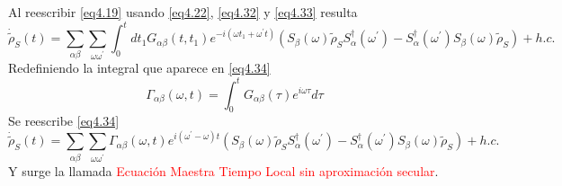 \documentclass{book}
\begin{document}
Al reescribir \ref{eq4.19} usando \ref{eq4.22}, \ref{eq4.32} y \ref{eq4.33} resulta
\begin{equation}\label{eq4.34}\dot{\tilde{\rho}}_S(t)=\sum_{\alpha\beta}\sum_{\omega\omega^\prime}\int_0^t dt_1 G_{\alpha\beta}(t,t_1)e^{-i(\omega t_1+\omega^\prime t)}(S_\beta(\omega)\tilde{\rho}_SS_\alpha^\dag(\omega^\prime)-S_\alpha^\dag(\omega^\prime)S_\beta(\omega)\tilde{\rho}_S)+h.c.\end{equation}
Redefiniendo la integral que aparece en \ref{eq4.34}
\begin{equation}\label{eq4.35}\Gamma_{\alpha\beta}(\omega,t)=\int_0^t G_{\alpha\beta}(\tau)e^{i\omega\tau} d\tau \end{equation}
Se reescribe \ref{eq4.34}
\begin{equation}\label{eq4.36}\dot{\tilde{\rho}}_S(t)=\sum_{\alpha\beta}\sum_{\omega\omega^\prime}\Gamma_{\alpha\beta}(\omega,t)e^{i(\omega^\prime-\omega)t}(S_\beta(\omega)\tilde{\rho}_SS_\alpha^\dag(\omega^\prime)-S_\alpha^\dag(\omega^\prime)S_\beta(\omega)\tilde{\rho}_S)+h.c.\end{equation}
Y surge la llamada \textcolor{red}{Ecuación Maestra Tiempo Local sin aproximación secular}.\\
\end{document}
